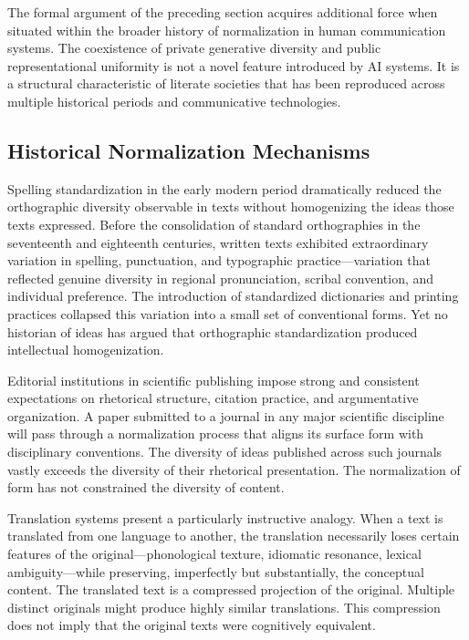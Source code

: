 \documentclass[12pt,a4paper]{article}
\theoremstyle{definition}
\theoremstyle{plain}
\theoremstyle{remark}
\begin{document}
The formal argument of the preceding section acquires additional force when situated within
the broader history of normalization in human communication systems. The coexistence of
private generative diversity and public representational uniformity is not a novel feature
introduced by AI systems. It is a structural characteristic of literate societies that has
been reproduced across multiple historical periods and communicative technologies.

\subsection{Historical Normalization Mechanisms}

Spelling standardization in the early modern period dramatically reduced the orthographic
diversity observable in texts without homogenizing the ideas those texts expressed. Before
the consolidation of standard orthographies in the seventeenth and eighteenth centuries,
written texts exhibited extraordinary variation in spelling, punctuation, and typographic
practice---variation that reflected genuine diversity in regional pronunciation, scribal
convention, and individual preference. The introduction of standardized dictionaries and
printing practices collapsed this variation into a small set of conventional forms. Yet no
historian of ideas has argued that orthographic standardization produced intellectual
homogenization.

Editorial institutions in scientific publishing impose strong and consistent expectations on
rhetorical structure, citation practice, and argumentative organization. A paper submitted to
a journal in any major scientific discipline will pass through a normalization process that
aligns its surface form with disciplinary conventions. The diversity of ideas published
across such journals vastly exceeds the diversity of their rhetorical presentation. The
normalization of form has not constrained the diversity of content.

Translation systems present a particularly instructive analogy. When a text is translated
from one language to another, the translation necessarily loses certain features of the
original---phonological texture, idiomatic resonance, lexical ambiguity---while preserving,
imperfectly but substantially, the conceptual content. The translated text is a compressed
projection of the original. Multiple distinct originals might produce highly similar
translations. This compression does not imply that the original texts were cognitively
equivalent.
\end{document}
